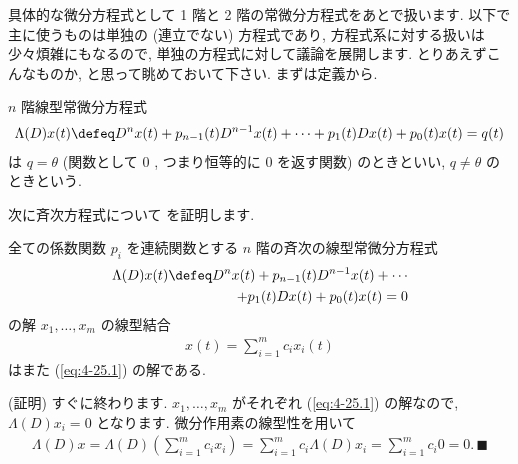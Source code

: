 \documentclass[openany, a4paper, oneside]{jsbook}
\begin{document}
具体的な微分方程式として 1 階と 2 階の常微分方程式をあとで扱います.
以下で主に使うものは単独の (連立でない) 方程式であり,
方程式系に対する扱いは少々煩雑にもなるので, 単独の方程式に対して議論を展開します.
とりあえずこんなものか, と思って眺めておいて下さい.
まずは定義から.
\begin{defn}
$n$ 階線型常微分方程式
\begin{gather}
\Lambda ( D ) x (t)
\defeq
D^n x (t) + p_{n-1} (t) D^{n-1} x (t) + \dotsb + p_{1}(t) D x (t) + p_{0}(t) x (t)
=
q (t)
\end{gather}
は $q = \theta$ (関数として $0$ , つまり恒等的に $0$ を返す関数) のときといい,
$q \not= \theta$ のときという.
\end{defn}
次に斉次方程式について
を証明します.
\begin{thm}[重ね合わせの原理]
全ての係数関数 $p_i$ を連続関数とする $n$ 階の斉次の線型常微分方程式
\begin{gather}
\begin{split}
\Lambda ( D ) x (t)
\defeq
D^n x (t) + p_{n-1} (t) D^{n-1} x (t) + \dotsb \\
+p_{1} (t) D x (t) + p_{0} (t) x (t)
=
0
\label{eq:4-25.1}
\end{split}
\end{gather}
の解 $x_1 , \dots , x_m$ の線型結合
\begin{gather}
x (t)
=
\sum_{i=1}^m c_i x_i (t)
\label{eq:4-25.3}
\end{gather}
はまた (\ref{eq:4-25.1}) の解である.
\end{thm}
(証明)
すぐに終わります.
$x_1 , \dots , x_m$ がそれぞれ (\ref{eq:4-25.1}) の解なので,  $\Lambda (D) x_i = 0$ となります.
微分作用素の線型性を用いて
\begin{gather}
\Lambda (D) x
=
\Lambda (D) \left ( \sum_{i=1}^m c_i x_i \right)
=
\sum_{i=1}^m c_i \Lambda (D) x_i
=
\sum_{i=1}^m c_i 0
=
0 . \, \blacksquare
\end{gather}
\end{document}
